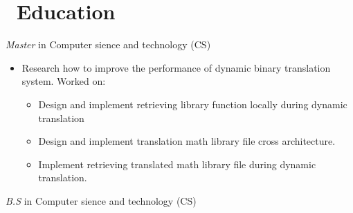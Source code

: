 \documentclass{resume}
\begin{document}
\section{\faGraduationCap\  Education}\normalsize
{}
\textit{Master} in Computer sience and technology (CS)
\begin{itemize}
\item Research how to improve the performance of dynamic binary translation system. Worked on:
  \begin{itemize}
  \item Design and implement retrieving library function locally during dynamic translation
  \item Design and implement translation math library file cross architecture.
  \item Implement retrieving translated math library file during dynamic translation.
  \end{itemize}

\end{itemize}
\textit{B.S} in Computer sience and technology (CS)


\end{document}
